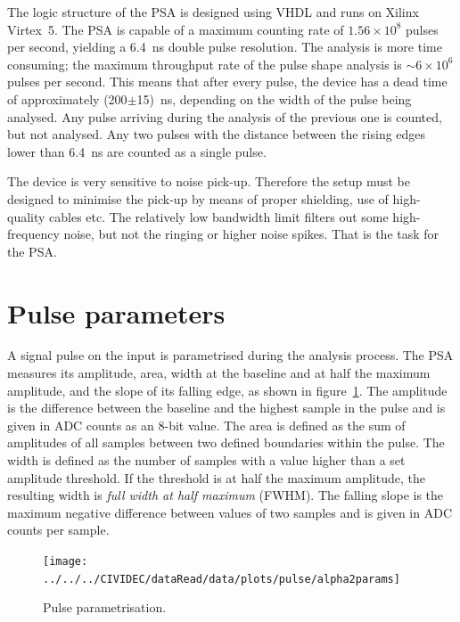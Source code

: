 The logic structure of the PSA is designed using VHDL and runs on Xilinx Virtex~5. The PSA is capable of a maximum counting rate of $1.56\times10^8$ pulses per second, yielding a 6.4~ns double pulse resolution. The analysis is more time consuming; the maximum throughput rate of the pulse shape analysis is $\sim6\times10^6$ pulses per second. This means that after every pulse, the device has a dead time of approximately (200$\pm$15)~ns, depending on the width of the pulse being analysed. Any pulse arriving during the analysis of the previous one is counted, but not analysed. Any two pulses with the distance between the rising edges lower than 6.4~ns are counted as a single pulse.

The device is very sensitive to noise pick-up. Therefore the setup must be designed to minimise the pick-up by means of proper shielding, use of high-quality cables etc. The relatively low bandwidth limit filters out some high-frequency noise, but not the ringing or higher noise spikes. That is the task for the PSA.


\section{Pulse parameters}
\label{sec:pulsepar}
A signal pulse on the input is parametrised during the analysis process. The PSA measures its amplitude, area, width at the baseline and at half the maximum amplitude, and the slope of its falling edge, as shown in figure~\ref{fig:params}. The amplitude is the difference between the baseline and the highest sample in the pulse and is given in ADC counts as an 8-bit value. The area is defined as the sum of amplitudes of all samples between two defined boundaries within the pulse. The width is defined as the number of samples with a value higher than a set amplitude threshold. If the threshold is at half the maximum amplitude, the resulting width is \emph{full width at half maximum} (FWHM). The falling slope is the maximum negative difference between values of two samples and is given in ADC counts per sample. 



\begin{figure}[!t]
\centering
\texttt{[image: ../../../CIVIDEC/dataRead/data/plots/pulse/alpha2params]}
\caption{Pulse parametrisation.}
\label{fig:params}
\end{figure}

